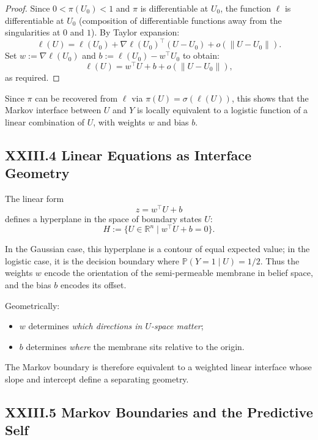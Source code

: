 \documentclass[11pt,letterpaper]{article}
\begin{document}
\begin{proof}
Since $0 < \pi(U_0) < 1$ and $\pi$ is differentiable at $U_0$, the function $\ell$ is differentiable at $U_0$ (composition of differentiable functions away from the singularities at $0$ and $1$). By Taylor expansion:
\[
\ell(U) = \ell(U_0) + \nabla \ell(U_0)^\top (U - U_0) + o(\|U - U_0\|).
\]
Set $w := \nabla \ell(U_0)$ and $b := \ell(U_0) - w^\top U_0$ to obtain:
\[
\ell(U) = w^\top U + b + o(\|U - U_0\|),
\]
as required.
\end{proof}

Since $\pi$ can be recovered from $\ell$ via $\pi(U) = \sigma(\ell(U))$, this shows that the Markov interface between $U$ and $Y$ is locally equivalent to a logistic function of a linear combination of $U$, with weights $w$ and bias $b$.

\subsection{XXIII.4 Linear Equations as Interface Geometry}

The linear form
\[
z = w^\top U + b
\]
defines a hyperplane in the space of boundary states $U$:
\[
H := \{U \in \mathbb{R}^n \mid w^\top U + b = 0\}.
\]

In the Gaussian case, this hyperplane is a contour of equal expected value; in the logistic case, it is the decision boundary where $\mathbb{P}(Y=1 \mid U) = 1/2$. Thus the weights $w$ encode the orientation of the semi-permeable membrane in belief space, and the bias $b$ encodes its offset.

Geometrically:

\begin{itemize}
  \item $w$ determines \emph{which directions in $U$-space matter};
  \item $b$ determines \emph{where} the membrane sits relative to the origin.
\end{itemize}

The Markov boundary is therefore equivalent to a weighted linear interface whose slope and intercept define a separating geometry.

\subsection{XXIII.5 Markov Boundaries and the Predictive Self}
\end{document}

